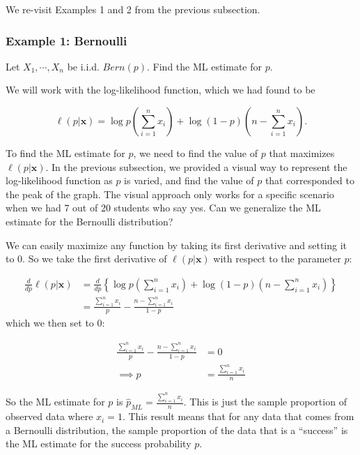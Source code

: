 \documentclass[
]{book}
\begin{document}
We re-visit Examples 1 and 2 from the previous subsection.

\subsubsection{Example 1: Bernoulli}\label{example-1-bernoulli-1}

Let \(X_1, \cdots, X_n\) be i.i.d. \(Bern(p)\). Find the ML estimate for \(p\).

We will work with the log-likelihood function, which we had found to be

\[
\ell (p | \boldsymbol{x}) = \log p \left(\sum_{i=1}^n x_i \right) + \log (1-p) \left( n - \sum_{i=1}^n x_i \right).
\]

To find the ML estimate for \(p\), we need to find the value of \(p\) that maximizes \(\ell (p | \boldsymbol{x})\). In the previous subsection, we provided a visual way to represent the log-likelihood function as \(p\) is varied, and find the value of \(p\) that corresponded to the peak of the graph. The visual approach only works for a specific scenario when we had 7 out of 20 students who say yes. Can we generalize the ML estimate for the Bernoulli distribution?

We can easily maximize any function by taking its first derivative and setting it to 0. So we take the first derivative of \(\ell (p | \boldsymbol{x})\) with respect to the parameter \(p\):

\[
\begin{split}
\frac{d}{d p}\ell (p | \boldsymbol{x}) &= \frac{d}{d p} \left\{ \log p \left(\sum_{i=1}^n x_i \right) + \log (1-p) \left( n - \sum_{i=1}^n x_i \right) \right\}\\
                          &= \frac{\sum_{i=1}^n x_i}{p} - \frac{n - \sum_{i=1}^n x_i}{1-p}
\end{split}
\]
which we then set to 0:

\[
\begin{split}
\frac{\sum_{i=1}^n x_i}{p} - \frac{n - \sum_{i=1}^n x_i}{1-p} &= 0\\
                                               \implies p     &= \frac{\sum_{i=1}^n x_i}{n}
\end{split}
\]

So the ML estimate for \(p\) is \(\hat{p}_{ML} = \frac{\sum_{i=1}^n x_i}{n}\). This is just the sample proportion of observed data where \(x_i = 1\). This result means that for any data that comes from a Bernoulli distribution, the sample proportion of the data that is a ``success'' is the ML estimate for the success probability \(p\).
\end{document}
